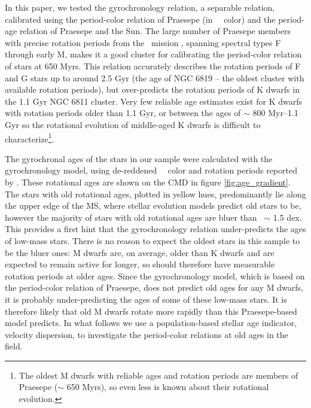 In this paper, we tested the \citet{angus2019} gyrochronology relation, a
separable relation, calibrated using the period-color relation of Praesepe (in
\gaia\ \gcolor\ color) and the period-age relation of Praesepe and the Sun.
The large number of Praesepe members with precise rotation periods from the
\ktwo\ mission \citep{douglas2017, rebull2017}, spanning spectral types F
through early M, makes it a good cluster for calibrating the period-color
relation of stars at 650 Myrs.
This relation accurately describes the rotation periods of F and G stars up to
around 2.5 Gyr (the age of NGC 6819 -- the oldest cluster with available
rotation periods), but over-predicts the rotation periods of K dwarfs in the
1.1 Gyr NGC 6811 cluster.
Very few reliable age estimates exist for K dwarfs with rotation periods older
than 1.1 Gyr, or between the ages of $\sim$ 800 Myr--1.1 Gyr so the rotational
evolution of middle-aged K dwarfs is difficult to characterize\footnote{The
oldest M dwarfs with reliable ages and rotation periods are members of
Praesepe ($\sim$ 650 Myrs), so even less is known about their rotational
evolution.}.

The gyrochronal ages of the stars in our sample were calculated with the
\citep{angus2019} gyrochronology model, using de-reddened \Gaia\ \gcolor\
color and rotation periods reported by \mct.
These rotational ages are shown on the CMD in figure \ref{fig:age_gradient}.
The stars with old rotational ages, plotted in yellow hues, predominantly lie
along the upper edge of the MS, where stellar evolution models predict old
stars to be, however the majority of stars with old rotational ages are bluer
than \gcolor\ $\sim$ 1.5 dex.
This provides a first hint that the \citet{angus2019} gyrochronology relation
under-predicts the ages of low-mass stars.
There is no reason to expect the oldest stars in this sample to be the bluer
ones: M dwarfs are, on average, older than K dwarfs and are expected to remain
active for longer, so should therefore have measurable rotation periods at
older ages.
Since the \citet{angus2019} gyrochronology model, which is based on the
period-color relation of Praesepe, does not predict old ages for any M dwarfs,
it is probably under-predicting the ages of some of these low-mass stars.
It is therefore likely that old M dwarfs rotate more rapidly than this
Praesepe-based model predicts.
In what follows we use a population-based stellar age indicator, velocity
dispersion, to investigate the period-color relations at old ages in the
field.

